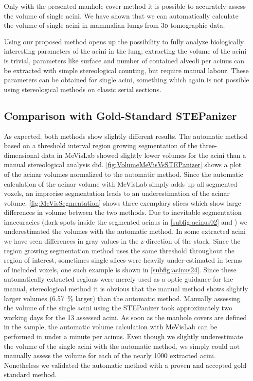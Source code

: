 \documentclass[%
	paper=a4,%
	abstract=true,%
	]{scrartcl}
\newcommand{\threed}{3\textsc{d}\xspace}
\begin{document}
Only with the presented manhole cover method it is possible to accurately assess the volume of single acini. We have shown that we can automatically calculate the volume of single acini in mammalian lungs from \threed tomographic data.

Using our proposed method opens up the possibility to fully analyze biologically interesting parameters of the acini in the lung; extracting the volume of the acini is trivial, parameters like surface and number of contained alveoli per acinus can be extracted with simple stereological counting, but require manual labour. These parameters can be obtained for single acini, something which again is not possible using stereological methods on classic serial sections.

\subsection{Comparison with Gold-Standard STEPanizer\label{subsec:MeVisVsSTEPanizer}}
As expected, both methods show slightly different results. The automatic method based on a threshold interval region growing segmentation of the three-dimensional data in MeVisLab showed slightly lower volumes for the acini than a manual stereological analysis did. \autoref{fig:VolumeMeVisVsSTEPanizer} shows a plot of the acinar volumes normalized to the automatic method. Since the automatic calculation of the acinar volume with MeVisLab simply adds up all segmented voxels, an imprecise segmentation leads to an underestimation of the acinar volume. \autoref{fig:MeVisSegmentation} shows three exemplary slices which show large differences in volume between the two methods. Due to inevitable segmentation inaccuracies (dark spots inside the segmented acinus in \autoref{subfig:acinus02} and ) we underestimated the volumes with the automatic method. In some extracted acini we have seen differences in gray values in the z-direction of the stack. Since the region growing segmentation method uses the same threshold throughout the region of interest, sometimes single slices were heavily under-estimated in terms of included voxels, one such example is shown in \autoref{subfig:acinus24}. Since these automatically extracted regions were merely used as a optic guidance for the manual, stereological method it is obvious that the manual method shows slightly larger volumes (\SI{6.57}{\percent} larger) than the automatic method. Manually assessing the volume of the single acini using the STEPanizer took approximately two working days for the 13 assessed acini. As soon as the manhole covers are defined in the sample, the automatic volume calculation with MeVisLab can be performed in under a minute per acinus. Even though we slightly underestimate the volume of the single acini with the automatic method, we simply could not manually assess the volume for each of the nearly 1000 extracted acini. Nonetheless we validated the automatic method with a proven and accepted gold standard method.
\end{document}
